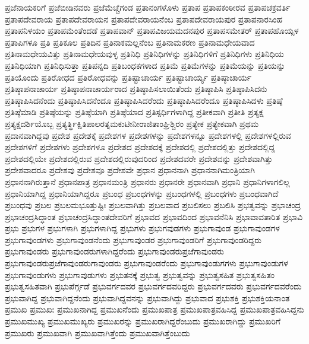 {ಪ್ರಜೆನಾಯಕರಿಗೆ
ಪ್ರಜೆಬೀಡಿನವರು
ಪ್ರಜೆಮೆಚ್ಚೆಗಂಡ
ಪ್ರತಾನಂಗಳೊಳು
ಪ್ರತಾಪ
ಪ್ರತಾಪಕಂಠೀರವ
ಪ್ರತಾಪಚಕ್ರವರ್ತಿ
ಪ್ರತಾಪದೇವರಾಯ
ಪ್ರತಾಪದೇವರಾಯನ
ಪ್ರತಾಪದೇವರಾಯನೆಂಬ
ಪ್ರತಾಪದೇವರಾಯಪುರ
ಪ್ರತಾಪನಾರಸಿಂಹ
ಪ್ರತಾಪನಿಳಯಂ
ಪ್ರತಾಪಮೆಂತೆಂದಡೆ
ಪ್ರತಾಪವಾನ್
ಪ್ರತಾಪವಿಜಯಮದನಪುರ
ಪ್ರತಾಪಸಮೇತರ್
ಪ್ರತಾಪಹೊಯ್ಸಳ
ಪ್ರತಾಪಿಗಳೂ
ಪ್ರತಿ
ಪ್ರತಿಕೂಲ
ಪ್ರತಿದಿನ
ಪ್ರತಿನಾಕಮಲ್ಲನೆಂಬ
ಪ್ರತಿನಾಮಕರಣ
ಪ್ರತಿನಾಮಧೇಯವಾದ
ಪ್ರತಿನಾಮಧೇಯವಿತ್ತು
ಪ್ರತಿನಾಮಧೇಯವುಳ್ಳ
ಪ್ರತಿನಿಧಿ
ಪ್ರತಿನಿಧಿಗಳನ್ನು
ಪ್ರತಿನಿಧಿಗಳಿಗೆ
ಪ್ರತಿನಿಧಿಗಳು
ಪ್ರತಿನಿಧಿಯ
ಪ್ರತಿನಿಧಿಯಾಗಿ
ಪ್ರತಿನಿಧಿಸುತ್ತಾ
ಪ್ರತಿಪನ್ನದಿ
ಪ್ರತಿಬಂಧಕಗಳಾದ
ಪ್ರತಿಮೆ
ಪ್ರತಿಮೆಗಳನ್ನು
ಪ್ರತಿಮೆಯನ್ನು
ಪ್ರತಿಯನ್ನು
ಪ್ರತಿಯೊಂದು
ಪ್ರತಿರೋಧದ
ಪ್ರತಿರೋಧವನ್ನು
ಪ್ರತಿಷ್ಟಾಚಾರ್ಯ
ಪ್ರತಿಷ್ಟಾಚಾರ್ಯ್ಯ
ಪ್ರತಿಷ್ಠಾಚಾರ್ಯ
ಪ್ರತಿಷ್ಠಾಪನಾಚಾರ್ಯ
ಪ್ರತಿಷ್ಠಾಪನಾಚಾರ್ಯರಾದ
ಪ್ರತಿಷ್ಠಾಪಿಸಲಾಯಿತೆಂದು
ಪ್ರತಿಷ್ಠಾಪಿಸಿ
ಪ್ರತಿಷ್ಠಾಪಿಸಿದನು
ಪ್ರತಿಷ್ಠಾಪಿಸಿದನೆಂದು
ಪ್ರತಿಷ್ಠಾಪಿಸಿದನೆಂದೂ
ಪ್ರತಿಷ್ಠಾಪಿಸಿದರೆಂದು
ಪ್ರತಿಷ್ಠಾಪಿಸಿದರೆಂದೂ
ಪ್ರತಿಷ್ಠಾಪಿಸಿದಳು
ಪ್ರತಿಷ್ಠೆ
ಪ್ರತಿಷ್ಠೆಮಾಡಿ
ಪ್ರತಿಷ್ಠೆಯನ್ನು
ಪ್ರತಿಷ್ಠೆಯಾಗಿ
ಪ್ರತಿಷ್ಠೆಯಾದ
ಪ್ರತಿಸ್ಪರ್ಧಿಗಳಾಗಿದ್ದ
ಪ್ರತೀಕವಾಗಿ
ಪ್ರತೀತಿ
ಪ್ರತ್ಯಕ್ಷ
ಪ್ರತ್ಯಕ್ಷದರ್ಶಿಯೊಬ್ಬ
ಪ್ರತ್ಯರ್ತ್ಥಿಕ್ಷಿತಿಪಾಲರತ್ನಮಕುಟೀನೀರಾಜಿತಾಂಘ್ರಿಶ್ಚಿರಂ
ಪ್ರತ್ಯೇಕ
ಪ್ರತ್ಯೇಕವಾಗಿ
ಪ್ರಥಮ
ಪ್ರದಾನವಾಗಿದ್ದವು
ಪ್ರದೇಶ
ಪ್ರದೇಶಕ್ಕೆ
ಪ್ರದೇಶಗಳ
ಪ್ರದೇಶಗಳನ್ನು
ಪ್ರದೇಶಗಳನ್ನೂ
ಪ್ರದೇಶಗಳಲ್ಲಿ
ಪ್ರದೇಶಗಳಲ್ಲಿರುವ
ಪ್ರದೇಶಗಳಿಗೆ
ಪ್ರದೇಶಗಳು
ಪ್ರದೇಶಗಳೂ
ಪ್ರದೇಶದ
ಪ್ರದೇಶದಕ್ಕೆ
ಪ್ರದೇಶದಲ್ಲಿ
ಪ್ರದೇಶದಲ್ಲಿತ್ತು
ಪ್ರದೇಶದಲ್ಲಿದ್ದ
ಪ್ರದೇಶದಲ್ಲಿಯೇ
ಪ್ರದೇಶದಲ್ಲಿರುವ
ಪ್ರದೇಶದಲ್ಲಿರುವುದರಿಂದ
ಪ್ರದೇಶದವರೇ
ಪ್ರದೇಶವನ್ನು
ಪ್ರದೇಶವಾಗಿತ್ತು
ಪ್ರದೇಶವಾದರೂ
ಪ್ರದೇಶವು
ಪ್ರದೇಶವೂ
ಪ್ರದೇಶವೇ
ಪ್ರಧಾನ
ಪ್ರಧಾನನಾಗಿ
ಪ್ರಧಾನನಾಗಿಮಂತ್ರಿಯಾಗಿ
ಪ್ರಧಾನನಾಗಿರುತ್ತಾನೆ
ಪ್ರಧಾನಪಾತ್ರ
ಪ್ರಧಾನಮಂತ್ರಿ
ಪ್ರಧಾನರು
ಪ್ರಧಾನರೇ
ಪ್ರಧಾನವಾಗಿ
ಪ್ರಧಾನಿ
ಪ್ರಧಾನಿಗಳಾಗಲಿಲ್ಲ
ಪ್ರಧಾನಿಯಾಗಿದ್ದ
ಪ್ರಧಾನಿಯಾಗಿದ್ದರೂ
ಪ್ರಬಂಧ
ಪ್ರಬಂಧಗಳನ್ನು
ಪ್ರಬಂಧಗಳಲ್ಲಿ
ಪ್ರಬಂಧಗಳು
ಪ್ರಬಂಧವಾಗಿದೆ
ಪ್ರಬಂಧವು
ಪ್ರಬಲ
ಪ್ರಬಲಮಭೂತ್ತುಷ್ಟಿಃ
ಪ್ರಬಲವಾಗಿತ್ತು
ಪ್ರಬಲವಾದ
ಪ್ರಬಲಿಸಲು
ಪ್ರಬಲಿಸಿ
ಪ್ರಭತ್ವವನ್ನು
ಪ್ರಭಾಚಂದ್ರ
ಪ್ರಭಾಚಂದ್ರಸಿದ್ಧಾಂತ
ಪ್ರಭಾಚಂದ್ರಸಿದ್ಧಾಂತದೇವರಿಗೆ
ಪ್ರಭಾವದ
ಪ್ರಭಾವದಿಂದ
ಪ್ರಭಾವನೆನಿಸಿ
ಪ್ರಭಾವಾವತಾರಿತ
ಪ್ರಭಾವಿ
ಪ್ರಭು
ಪ್ರಭುಗಳ
ಪ್ರಭುಗಳಾಗಿ
ಪ್ರಭುಗಳಾಗಿದ್ದ
ಪ್ರಭುಗಳು
ಪ್ರಭುಗವುಡಗಳು
ಪ್ರಭುಗಾವುಂಡ
ಪ್ರಭುಗಾವುಂಡಗಳ
ಪ್ರಭುಗಾವುಂಡಗಳು
ಪ್ರಭುಗಾವುಂಡನೆಂದು
ಪ್ರಭುಗಾವುಂಡರ
ಪ್ರಭುಗಾವುಂಡರಿಗೆ
ಪ್ರಭುಗಾವುಂಡರಿದ್ದರು
ಪ್ರಭುಗಾವುಂಡರು
ಪ್ರಭುಗಾವುಂಡರುಗಳಾಗಿದ್ದರೆಂದು
ಪ್ರಭುಗಾವುಂಡರುಪ್ರಜೆಗಾವುಂಡರು
ಪ್ರಭುಗಾವುಂಡರುಪ್ರಜೆಗಾವುಂಡರುಗಾವುಂಡರು
ಪ್ರಭುಗಾವುಂಡರೆಂದು
ಪ್ರಭುಗಾವುಂಡುಗಗಳು
ಪ್ರಭುಗಾವುಂಡುಗಳ
ಪ್ರಭುಗಾವುಂಡುಗಳು
ಪ್ರಭುಗಾವುಡುಗಳು
ಪ್ರಭುತನಕ್ಕೆ
ಪ್ರಭುತ್ವ
ಪ್ರಭುತ್ವವನ್ನು
ಪ್ರಭುತ್ವಸಹಿತ
ಪ್ರಭುತ್ವಸಹಿತಂ
ಪ್ರಭುತ್ವಸಹಿತವಾಗಿ
ಪ್ರಭುಪೆರ್ಗ್ಗಡೆ
ಪ್ರಭುವರ್ಗದವರ
ಪ್ರಭುವರ್ಗದವರಿದ್ದರು
ಪ್ರಭುವರ್ಗದವರು
ಪ್ರಭುವರ್ಗದವರೆಂದು
ಪ್ರಭುವಾಗಿದ್ದ
ಪ್ರಭುವಾಗಿದ್ದನೆಂದು
ಪ್ರಭುವಾಗಿದ್ದವನನ್ನು
ಪ್ರಭುವಾಗಿದ್ದು
ಪ್ರಭುವಾದ
ಪ್ರಭುಶಕ್ತಿ
ಪ್ರಭುಶಕ್ತಿಯನಾಂತ
ಪ್ರಮುಖ
ಪ್ರಮುಖಃ
ಪ್ರಮುಖನಾಗಿದ್ದ
ಪ್ರಮುಖನೆಂದು
ಪ್ರಮುಖಪಾತ್ರ
ಪ್ರಮುಖಪಾತ್ರವಹಿಸಿದ್ದ
ಪ್ರಮುಖಪಾತ್ರವಹಿಸಿದ್ದನು
ಪ್ರಮುಖಮುಖ್ಯ
ಪ್ರಮುಖಮುಖ್ಯರು
ಪ್ರಮುಖರನ್ನು
ಪ್ರಮುಖರಾಗಿದ್ದರೆಂಬುದು
ಪ್ರಮುಖರಾಗಿದ್ದು
ಪ್ರಮುಖರಿಗೆ
ಪ್ರಮುಖರು
ಪ್ರಮುಖವಾಗಿ
ಪ್ರಮುಖವಾಗಿತ್ತೆಂದು
ಪ್ರಮುಖವಾಗಿತ್ತೆಂಬುದು
}
